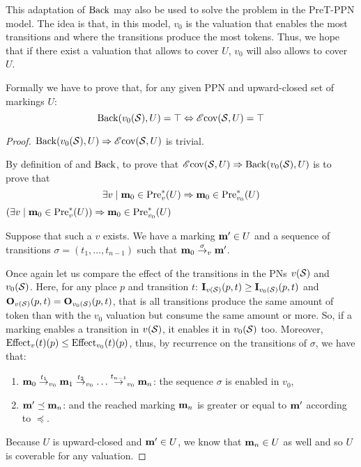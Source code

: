 
This adaptation of $\operatorname{Back}$ may also be used to solve the \Ecov problem in the PreT-\ac{PPN} model.
The idea is that, in this model, $v_0$ is the valuation that enables the most transitions and where the transitions produce the most tokens.
Thus, we hope that if there exist a valuation that allows to cover $U$, $v_0$ will also allows to cover $U$.

Formally we have to prove that, for any given \ac{PPN} \SPTPm and upward-closed set of markings $U$:
  \[
    \operatorname{Back}(v_0(\mathcal{S}), U) = \top \Leftrightarrow \operatorname{\mathscr{E}cov}(\mathcal{S}, U) = \top
  \]

\begin{proof}
  $\operatorname{Back}(v_0(\mathcal{S}), U) \Rightarrow \operatorname{\mathscr{E}cov}(\mathcal{S}, U)$ is trivial.

  By definition of \Ecov and $\operatorname{Back}$, to prove that $\operatorname{\mathscr{E}cov}(\mathcal{S}, U) \Rightarrow \operatorname{Back}(v_0(\mathcal{S}), U)$ is to prove that
  \[
    \exists v \mid \mathbf{m}_0 \in \operatorname{Pre}^*_{v}(U) \Rightarrow \mathbf{m}_0 \in \operatorname{Pre}^*_{v_0}(U)
  \]
  $ \left( \exists v \mid \mathbf{m}_0 \in \operatorname{Pre}^*_{v}(U) \right) \Rightarrow \mathbf{m}_0 \in \operatorname{Pre}^*_{v_0}(U) $

  Suppose that such a $v$ exists. We have a marking $\mathbf{m'} \in U$ and a sequence of transitions $\sigma = (t_1, \dots, t_{n-1})$ such that $\mathbf{m}_0 \stackrel{\sigma}{\to}_v \mathbf{m'}$.

  Once again let us compare the effect of the transitions in the \acp{PN} $v(\mathcal{S})$ and $v_0(\mathcal{S})$. Here, for any place $p$ and transition $t$: $\mathbf{I}_{v(\mathcal{S})}(p,t) \geq \mathbf{I}_{v_0(\mathcal{S})}(p,t)$ and $\mathbf{O}_{v(\mathcal{S})}(p,t) = \mathbf{O}_{v_0(\mathcal{S})}(p,t)$, that is all transitions produce the same amount of token than with the $v_0$ valuation but consume the same amount or more. So, if a marking enables a transition in $v(\mathcal{S})$, it enables it in $v_0(\mathcal{S})$ too. Moreover, $\operatorname{Effect}_v(t)(p) \leq \operatorname{Effect}_{v_0}(t)(p)$, thus, by recurrence on the transitions of $\sigma$, we have that:
  \begin{enumerate}
    \item $\mathbf{m}_0 \stackrel{t_1}{\to}_{v_0} \mathbf{m}_1 \stackrel{t_2}{\to}_{v_0} \dots \stackrel{t_{n-1}}{\to}_{v_0} \mathbf{m}_n$: the sequence $\sigma$ is enabled in $v_0$,
    \item $\mathbf{m'} \preceq \mathbf{m}_n$: and the reached marking $\mathbf{m}_n$ is greater or equal to $\mathbf{m'}$ according to $\preceq$.
  \end{enumerate}

  Because $U$ is upward-closed and $\mathbf{m'} \in U$, we know that $\mathbf{m}_n \in U$ as well and so $U$ is coverable for any valuation.
\end{proof}

